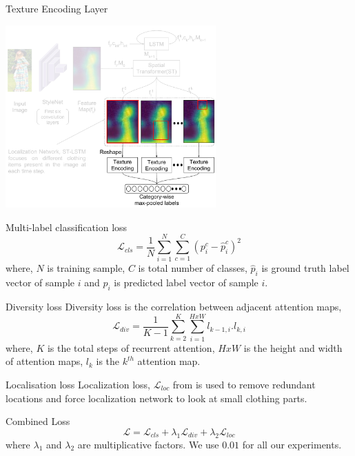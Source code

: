 \documentclass[handout]{beamer}
\begin{document}
\begin{frame}{Texture Encoding Layer}
\vspace{-1cm}
  \begin{center}
    \includegraphics[width=0.8\linewidth, height=7cm]{images/staqu_st_ten_arch_text}
  \end{center}
\end{frame}

\begin{frame}{Multi-label classification loss}
      \begin{equation}
        \mathcal{L}_{cls} = \frac{1}{N} \sum^N_{i=1}\sum^C_{c=1}(p^c_i-\hat{p}^c_i)^2
      \end{equation}
      where, $N$ is training sample, $C$ is total number of classes, $\hat{p}_i$ is ground truth label vector of sample $i$ and $p_i$ is predicted label vector of sample $i$.
\end{frame}

\begin{frame}{Diversity loss}
  Diversity loss is the correlation between adjacent attention maps,
  \begin{equation}
    \mathcal{L}_{div} = \frac{1}{K-1} \sum^K_{k=2}\sum^{HxW}_{i=1} l_{k-1,i}.l_{k,i}
  \end{equation}
  where, $K$ is the total steps of recurrent attention, $HxW$ is the height and width of attention maps, $l_{k}$ is the $k^{th}$ attention map.
\end{frame}

\begin{frame}{Localisation loss}
  Localization loss, $\mathcal{L}_{loc}$ from \cite{WangSTLSTMICCV2017} is used to remove redundant locations and force localization network to look at small clothing parts.
\end{frame}

\begin{frame}{Combined Loss}
  \begin{equation}
    \mathcal{L} = \mathcal{L}_{cls} + \lambda_1\mathcal{L}_{div} + \lambda_2\mathcal{L}_{loc}
  \end{equation}
  where $\lambda_1$ and $\lambda_2$ are multiplicative factors. We use $0.01$ for all our experiments.
\end{frame}
\end{document}
